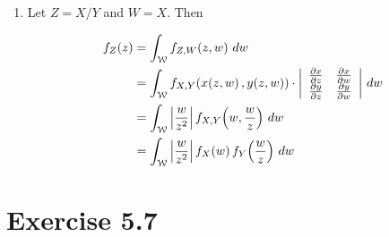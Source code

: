 \documentclass[12pt,letterpaper,reqno]{amsart}
\numberwithin{equation}{subsection}
\begin{document}
\begin{enumerate}[label=(\alph*),leftmargin=*]
\item Let $Z = X/Y$ and $W = X$. Then

\begin{align*}
    \fun{f_Z}{z} &= \myint{\fun{f_{Z,W}}{z,w}}{w}{\mycal{W}}{} \\
    &= \myint{\fun{f_{X,Y}}{\fun{x}{z,w}, \fun{y}{z,w}} \cdot \left\vert \begin{array}{cc}
         \dif{x}{z} & \dif{x}{w} \\
         \dif{y}{z} & \dif{y}{w}
    \end{array} \right\vert}{w}{\mycal{W}}{} \\
    &= \myint{\Abs{\frac{w}{z^2}}\fun{f_{X,Y}}{w, \frac{w}{z}}}{w}{\mycal{W}}{} \\
    &= \myint{\Abs{\frac{w}{z^2}} \fun{f_X}{w} \fun{f_Y}{\frac{w}{z}}}{w}{\mycal{W}}{}
\end{align*}
\end{enumerate}

\newpage
\section{Exercise 5.7}
\end{document}
